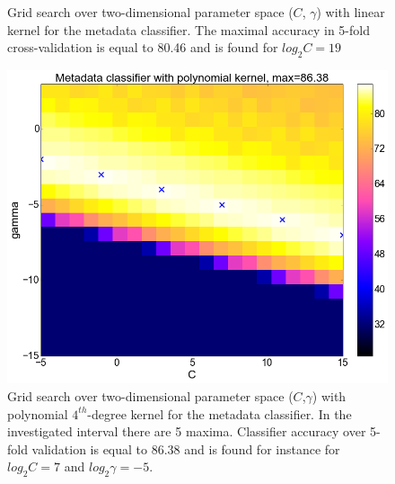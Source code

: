 \begin{center}
\begin{figure}
  \caption{Grid search over two-dimensional parameter space ($C$, $\gamma$) with linear kernel for the metadata classifier. The maximal accuracy in 5-fold cross-validation is equal to 80.46 and is found for $log_{2}C=19$}
  \label{fig:meta_linear}
\end{figure}
\begin{figure}
\centering
  \includegraphics[width=\textwidth]{plots/meta_poly}
  \caption{Grid search over two-dimensional parameter space ($C$,$\gamma$) with polynomial $4^{th}$-degree kernel for the metadata classifier. In the investigated interval there are 5 maxima. Classifier accuracy over 5-fold validation is equal to 86.38 and is found for instance for $log_{2}C=7$ and $log_{2}\gamma=-5$.}
  \label{fig:meta_poly}
\end{figure}


\end{center}
